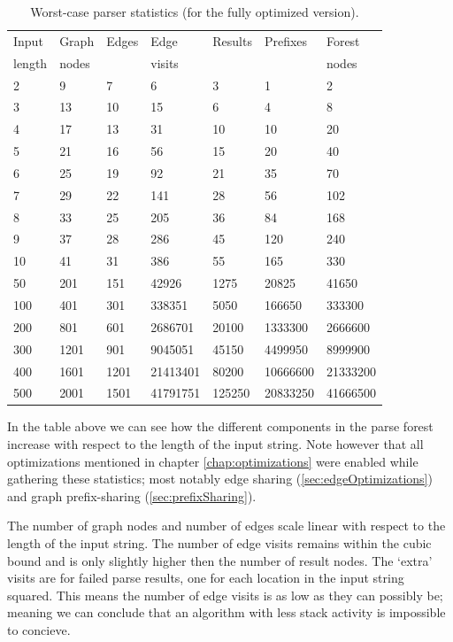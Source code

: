 \documentclass[a4paper,10pt]{article}
\begin{document}
\begin{table}[H]
\centering
\begin{tabular}{ | p{7ex} | p{7ex} | p{7ex} | p{10ex} | p{8ex} | p{10ex} | p{10ex} | }
  \hline
  Input & Graph & Edges & Edge & Results & Prefixes & Forest \\
  length & nodes & & visits & & & nodes \\
  \hline
  2 & 9 & 7 & 6 & 3 & 1 & 2 \\
  3 & 13 & 10 & 15 & 6 & 4 & 8 \\
  4 & 17 & 13 & 31 & 10 & 10 & 20 \\
  5 & 21 & 16 & 56 & 15 & 20 & 40 \\
  6 & 25 & 19 & 92 & 21 & 35 & 70 \\
  7 & 29 & 22 & 141 & 28 & 56 & 102 \\
  8 & 33 & 25 & 205 & 36 & 84 & 168 \\
  9 & 37 & 28 & 286 & 45 & 120 & 240 \\
  10 & 41 & 31 & 386 & 55 & 165 & 330 \\
  \hline
  50 & 201 & 151 & 42926 & 1275 & 20825 & 41650 \\
  100 & 401 & 301 & 338351 & 5050 & 166650 & 333300 \\
  200 & 801 & 601 & 2686701 & 20100 & 1333300 & 2666600 \\
  300 & 1201 & 901 & 9045051 & 45150 & 4499950 & 8999900 \\
  400 & 1601 & 1201 & 21413401 & 80200 & 10666600 & 21333200 \\
  500 & 2001 & 1501 & 41791751 & 125250 & 20833250 & 41666500 \\
  \hline
\end{tabular}
\caption{Worst-case parser statistics (for the fully optimized version).}
\end{table}

In the table above we can see how the different components in the parse forest increase with respect to the length of the input string. Note however that all optimizations mentioned in chapter \ref{chap:optimizations} were enabled while gathering these statistics; most notably edge sharing (\ref{sec:edgeOptimizations}) and graph prefix-sharing (\ref{sec:prefixSharing}).

The number of graph nodes and number of edges scale linear with respect to the length of the input string. The number of edge visits remains within the cubic bound and is only slightly higher then the number of result nodes. The `extra' visits are for failed parse results, one for each location in the input string squared. This means the number of edge visits is as low as they can possibly be; meaning we can conclude that an algorithm with less stack activity is impossible to concieve.
\end{document}
